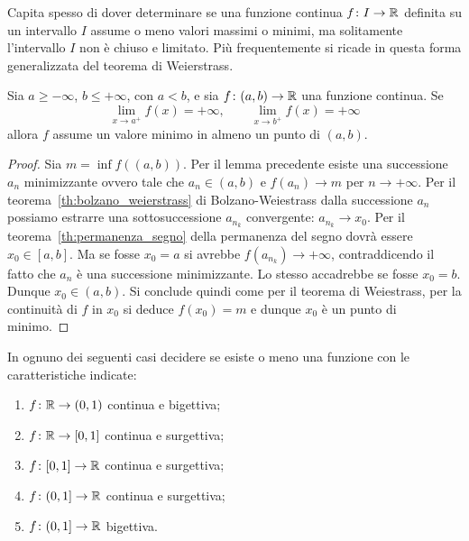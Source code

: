 Capita spesso di dover determinare se una funzione continua 
$f\colon I\to {\mathbb R}$ definita su un intervallo $I$
assume o meno valori massimi o minimi, 
ma solitamente l'intervallo $I$ non è chiuso e limitato. 
Più frequentemente si ricade in questa forma generalizzata 
del teorema di Weierstrass.
\begin{theorem}%
  \label{th:weierstrass_generalizzato}%
  \mymark{***}%
Sia $a\ge -\infty$, $b\le +\infty$, con $a<b$, e
sia $f\colon (a,b)\to {\mathbb R}$ una funzione continua.
Se 
\[
 \lim_{x\to a^+} f(x) = +\infty, \qquad 
 \lim_{x\to b^+} f(x) = +\infty
\]
allora $f$ assume un valore minimo in almeno un punto di $(a,b)$.
\end{theorem}
\begin{proof}
Sia $m=\inf f((a,b))$.
Per il lemma precedente esiste una successione $a_n$ minimizzante ovvero tale che
$a_n \in (a,b)$ e $f(a_n)\to m$ per $n\to +\infty$.
Per il teorema~\ref{th:bolzano_weierstrass} di Bolzano-Weiestrass 
dalla successione $a_n$ possiamo estrarre una sottosuccessione
$a_{n_k}$ convergente: $a_{n_k} \to x_0$.
Per il teorema~\ref{th:permanenza_segno} della permanenza del segno
dovrà essere $x_0 \in [a,b]$.
Ma se fosse $x_0=a$ si avrebbe $f(a_{n_k}) \to +\infty$,
contraddicendo il fatto che $a_n$ è una successione minimizzante.
Lo stesso accadrebbe se fosse $x_0=b$. Dunque $x_0 \in (a,b)$.
Si conclude quindi come per il teorema di Weiestrass, 
per la continuità di $f$ in $x_0$ si deduce $f(x_0) = m$
e dunque $x_0$ è un punto di minimo.
\end{proof}

\begin{exercise}
In ognuno dei seguenti casi decidere se esiste o meno una funzione 
con le caratteristiche indicate:
\begin{enumerate}
  \item $f\colon {\mathbb R}\to (0,1)$ continua e bigettiva;
  \item $f\colon {\mathbb R}\to [0,1]$ continua e surgettiva;
  \item $f\colon [0,1]\to {\mathbb R}$ continua e surgettiva;
  \item $f\colon (0,1]\to {\mathbb R}$ continua e surgettiva;
  \item $f\colon (0,1]\to {\mathbb R}$ bigettiva. 
\end{enumerate}
\end{exercise}
